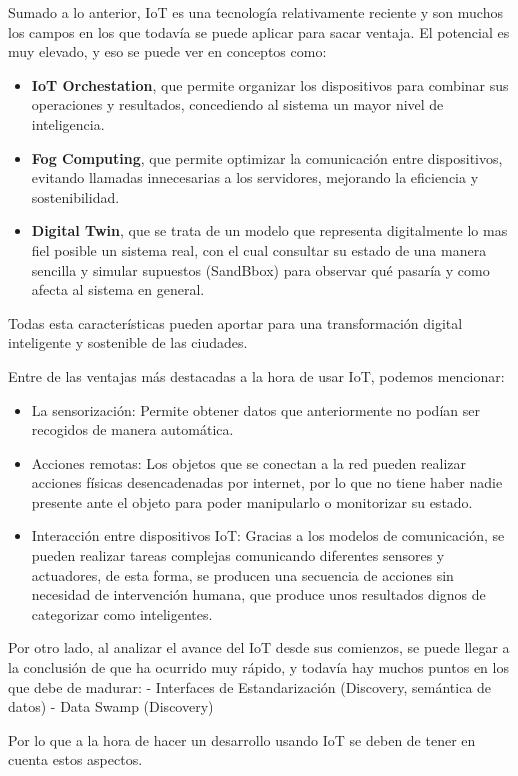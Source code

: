 \documentclass[12pt, a4paper, twoside]{article}
\begin{document}
Sumado a lo anterior, IoT es una tecnología relativamente reciente y son muchos los campos en los que 
todavía se puede aplicar para sacar ventaja. El potencial es muy elevado, y eso se puede ver en
conceptos como:
\begin{itemize}
  \item \textbf{IoT Orchestation}, que permite organizar los dispositivos para combinar sus operaciones
  y resultados, concediendo al sistema un mayor nivel de inteligencia.
  \item \textbf{Fog Computing}, que permite optimizar la comunicación entre dispositivos, evitando llamadas
  innecesarias a los servidores, mejorando la eficiencia y sostenibilidad.
  \item \textbf{Digital Twin}, que se trata de un modelo que representa digitalmente lo mas fiel posible
   un sistema real, con el cual consultar su estado de una manera sencilla y simular supuestos
   (SandBbox) para observar qué pasaría y como afecta al sistema en general.
\end{itemize}
Todas esta características pueden aportar para una transformación digital inteligente y sostenible de las ciudades.

Entre de las ventajas más destacadas a la hora de usar IoT, podemos mencionar:
\begin{itemize}
    \item La sensorización: Permite obtener datos que anteriormente no podían ser recogidos de manera automática.
    \item Acciones remotas: Los objetos que se conectan a la red pueden realizar acciones físicas desencadenadas por internet,
      por lo que no tiene haber nadie presente ante el objeto para poder manipularlo o monitorizar su estado.
    \item Interacción entre dispositivos IoT: Gracias a los modelos de comunicación, se pueden realizar tareas complejas
      comunicando diferentes sensores y actuadores, de esta forma, se producen una secuencia de acciones sin necesidad
      de intervención humana, que produce unos resultados dignos de categorizar como inteligentes.
\end{itemize}


Por otro lado, al analizar el avance del IoT desde sus comienzos, se puede llegar a la conclusión 
de que ha ocurrido muy rápido, y todavía hay muchos puntos en los que debe de madurar:
 - Interfaces de Estandarización (Discovery, semántica de datos)
 - Data Swamp (Discovery)

 Por lo que a la hora de hacer un desarrollo usando IoT se deben de tener en cuenta estos aspectos.
\end{document}
